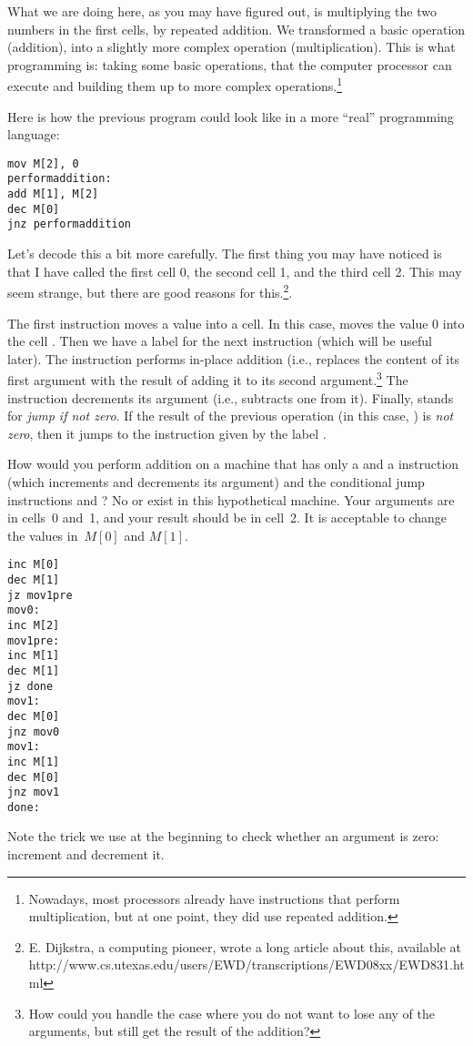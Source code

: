 What we are doing here, as you may have figured out, is multiplying the two
numbers in the first cells, by repeated addition. We transformed a basic
operation (addition), into a slightly more complex operation (multiplication).
This is what programming is: taking some basic operations, that the computer
processor can execute and building them up to more complex
operations.\footnote{Nowadays, most processors already have instructions that
perform multiplication, but at one point, they did use repeated addition.}

Here is how the previous program could look like in a more ``real'' programming
language:

\begin{verbatim}
mov M[2], 0
performaddition:
add M[1], M[2]
dec M[0]
jnz performaddition
\end{verbatim}

Let's decode this a bit more carefully. The first thing you may have noticed is
that I have called the first cell 0, the second cell 1, and the third cell 2.
This may seem strange, but there are good reasons for this.\footnote{
E. Dijkstra, a computing pioneer, wrote a long article about this, available at
http://www.cs.utexas.edu/users/EWD/transcriptions/EWD08xx/EWD831.html}.

The first instruction  moves a value into a cell. In this
case, moves the value 0 into the cell . Then we have a label
for the next instruction (which will be useful later). The 
instruction performs in-place addition (i.e., replaces the content of its first
argument with the result of adding it to its second argument.\footnote{How could
you handle the case where you do not want to lose any of the arguments, but
still get the result of the addition?} The  instruction
decrements its argument (i.e., subtracts one from it). Finally,
 stands for \emph{jump if not zero}. If the result of the
previous operation (in this case, ) is \emph{not zero}, then
it jumps to the instruction given by the label .

\begin{exercise}
How would you perform addition on a machine that has only a 
and a  instruction (which increments and decrements its
argument) and the conditional jump instructions  and
? No  or  exist in this
hypothetical machine. Your arguments are in cells~0 and~1, and your result
should be in cell~2. It is acceptable to change the values in~$M[0]$ and
$M[1]$.
\begin{solution}
\begin{verbatim}
inc M[0]
dec M[1]
jz mov1pre
mov0:
inc M[2]
mov1pre:
inc M[1]
dec M[1]
jz done
mov1:
dec M[0]
jnz mov0
mov1:
inc M[1]
dec M[0]
jnz mov1
done:
\end{verbatim}

Note the trick we use at the beginning to check whether an argument is zero:
increment and decrement it.
\end{solution}
\end{exercise}

